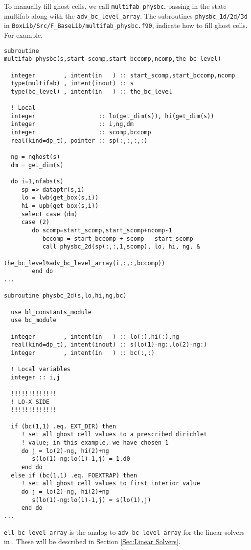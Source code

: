 To manually fill ghost cells, we call {\tt multifab\_physbc}, passing in the state multifab
along with the {\tt adv\_bc\_level\_array}.  The subroutines {\tt physbc\_1d/2d/3d} in
{\tt BoxLib/Src/F\_BaseLib/multifab\_physbc.f90}, indicate how to fill ghost cells.  For example,
\begin{lstlisting}[backgroundcolor=\color{light-green}]
subroutine multifab_physbc(s,start_scomp,start_bccomp,ncomp,the_bc_level)

  integer        , intent(in   ) :: start_scomp,start_bccomp,ncomp
  type(multifab) , intent(inout) :: s
  type(bc_level) , intent(in   ) :: the_bc_level

  ! Local
  integer                  :: lo(get_dim(s)), hi(get_dim(s))
  integer                  :: i,ng,dm
  integer                  :: scomp,bccomp
  real(kind=dp_t), pointer :: sp(:,:,:,:)
    
  ng = nghost(s)
  dm = get_dim(s)
    
  do i=1,nfabs(s)
     sp => dataptr(s,i)
     lo = lwb(get_box(s,i))
     hi = upb(get_box(s,i))
     select case (dm)
     case (2)
        do scomp=start_scomp,start_scomp+ncomp-1
           bccomp = start_bccomp + scomp - start_scomp
           call physbc_2d(sp(:,:,1,scomp), lo, hi, ng, &
                          the_bc_level%adv_bc_level_array(i,:,:,bccomp))
        end do
...

subroutine physbc_2d(s,lo,hi,ng,bc)

  use bl_constants_module
  use bc_module

  integer        , intent(in   ) :: lo(:),hi(:),ng
  real(kind=dp_t), intent(inout) :: s(lo(1)-ng:,lo(2)-ng:)
  integer        , intent(in   ) :: bc(:,:)

  ! Local variables
  integer :: i,j

  !!!!!!!!!!!!!
  ! LO-X SIDE
  !!!!!!!!!!!!!

  if (bc(1,1) .eq. EXT_DIR) then
     ! set all ghost cell values to a prescribed dirichlet
     ! value; in this example, we have chosen 1
     do j = lo(2)-ng, hi(2)+ng
        s(lo(1)-ng:lo(1)-1,j) = 1.d0
     end do
  else if (bc(1,1) .eq. FOEXTRAP) then
     ! set all ghost cell values to first interior value
     do j = lo(2)-ng, hi(2)+ng
        s(lo(1)-ng:lo(1)-1,j) = s(lo(1),j)
     end do
...
\end{lstlisting}

{\tt ell\_bc\_level\_array} is the analog to {\tt adv\_bc\_level\_array} for the linear solvers in
\BoxLib.  These will be described in Section \ref{Sec:Linear Solvers}.

